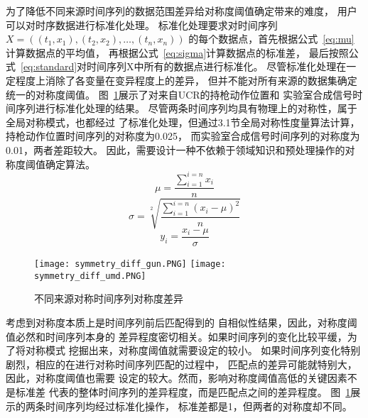 为了降低不同来源时间序列的数据范围差异给对称度阈值确定带来的难度，
用户可以对时序数据进行标准化处理。
标准化处理要求对时间序列$X=\left(\left(t_{1}, x_{1}\right),\left(t_{2}, x_{2}\right), \ldots,\left(t_{n}, x_{n}\right)\right)$
的每个数据点，首先根据公式~\ref{eq:mu}计算数据点的平均值，
再根据公式~\ref{eq:sigma}计算数据点的标准差，
最后按照公式~\ref{eq:standard}对时间序列X中所有的数据点进行标准化。
尽管标准化处理在一定程度上消除了各变量在变异程度上的差异，
但并不能对所有来源的数据集确定统一的对称度阈值。
图~\ref{fig:symmetry_diff}展示了对来自UCR的持枪动作位置和
实验室合成信号时间序列进行标准化处理的结果。
尽管两条时间序列均具有物理上的对称性，属于全局对称模式，也都经过
了标准化处理，但通过3.1节全局对称性度量算法计算，
持枪动作位置时间序列的对称度为0.025，
而实验室合成信号时间序列的对称度为0.01，两者差距较大。
因此，需要设计一种不依赖于领域知识和预处理操作的对称度阈值确定算法。
\begin{equation}
  \mu=\frac{\sum_{i=1}^{i=n} x_{i}}{n}
  \label{eq:mu}
\end{equation}
\begin{equation}
  \sigma=\sqrt[2]{\frac{\sum_{i=1}^{i=n}\left(x_{i}-\mu\right)^{2}}{n}}
  \label{eq:sigma}
\end{equation}
\begin{equation}
  y_{i}=\frac{x_{i}-\mu}{\sigma}
  \label{eq:standard}
\end{equation}

\begin{figure}
  \centering
  {\texttt{[image: symmetry\_diff\_gun.PNG]}}
  {\texttt{[image: symmetry\_diff\_umd.PNG]}}
  \caption{不同来源对称时间序列对称度差异}
  \label{fig:symmetry_diff}
\end{figure}

考虑到对称度本质上是时间序列前后匹配得到的
自相似性结果，因此，对称度阈值必然和时间序列本身的
差异程度密切相关。如果时间序列的变化比较平缓，为了将对称模式
挖掘出来，对称度阈值就需要设定的较小。
如果时间序列变化特别剧烈，相应的在进行对称时间序列匹配的过程中，
匹配点的差异可能就特别大，因此，对称度阈值也需要
设定的较大。然而，影响对称度阈值高低的关键因素不是标准差
代表的整体时间序列的差异程度，而是匹配点之间的差异程度。
图~\ref{fig:symmetry_diff}展示的两条时间序列均经过标准化操作，
标准差都是1，但两者的对称度却不同。

